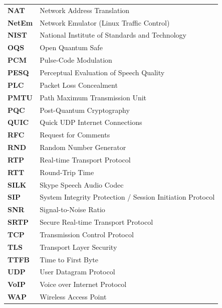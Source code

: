 \begin{tabular}{p{3.0cm} p{11.5cm}}
    \textbf{NAT} & Network Address Translation \\
    \textbf{NetEm} & Network Emulator (Linux Traffic Control) \\
    \textbf{NIST} & National Institute of Standards and Technology \\
    \textbf{OQS} & Open Quantum Safe \\
    \textbf{PCM} & Pulse-Code Modulation \\
    \textbf{PESQ} & Perceptual Evaluation of Speech Quality \\
    \textbf{PLC} & Packet Loss Concealment \\
    \textbf{PMTU} & Path Maximum Transmission Unit \\
    \textbf{PQC} & Post-Quantum Cryptography \\
    \textbf{QUIC} & Quick UDP Internet Connections \\
    \textbf{RFC} & Request for Comments \\
    \textbf{RND} & Random Number Generator \\
    \textbf{RTP} & Real-time Transport Protocol \\
    \textbf{RTT} & Round-Trip Time \\
    \textbf{SILK} & Skype Speech Audio Codec \\
    \textbf{SIP} & System Integrity Protection / Session Initiation Protocol \\
    \textbf{SNR} & Signal-to-Noise Ratio \\
    \textbf{SRTP} & Secure Real-time Transport Protocol \\
    \textbf{TCP} & Transmission Control Protocol \\
    \textbf{TLS} & Transport Layer Security \\
    \textbf{TTFB} & Time to First Byte \\
    \textbf{UDP} & User Datagram Protocol \\
    \textbf{VoIP} & Voice over Internet Protocol \\
    \textbf{WAP} & Wireless Access Point \\
\end{tabular}
